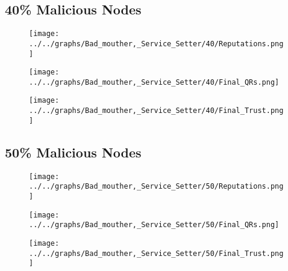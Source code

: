 \begin{minipage}[t]{0.49\columnwidth}
\subsection*{40\% Malicious Nodes}
    \begin{figure}[H]
        \centering
        \texttt{[image: ../../graphs/Bad\_mouther,\_Service\_Setter/40/Reputations.png]}
    \end{figure}
    \begin{figure}[H]
        \centering
        \texttt{[image: ../../graphs/Bad\_mouther,\_Service\_Setter/40/Final\_QRs.png]}
    \end{figure}
\end{minipage}
\begin{minipage}[t]{0.49\columnwidth}
    \begin{figure}[H]
        \centering
        \texttt{[image: ../../graphs/Bad\_mouther,\_Service\_Setter/40/Final\_Trust.png]}
    \end{figure}
\end{minipage}

\begin{minipage}[t]{0.49\columnwidth}
\subsection*{50\% Malicious Nodes}
    \begin{figure}[H]
        \centering
        \texttt{[image: ../../graphs/Bad\_mouther,\_Service\_Setter/50/Reputations.png]}
    \end{figure}
    \begin{figure}[H]
        \centering
        \texttt{[image: ../../graphs/Bad\_mouther,\_Service\_Setter/50/Final\_QRs.png]}
    \end{figure}
\end{minipage}
\begin{minipage}[t]{0.49\columnwidth}
    \begin{figure}[H]
        \centering
        \texttt{[image: ../../graphs/Bad\_mouther,\_Service\_Setter/50/Final\_Trust.png]}
    \end{figure}
\end{minipage}

